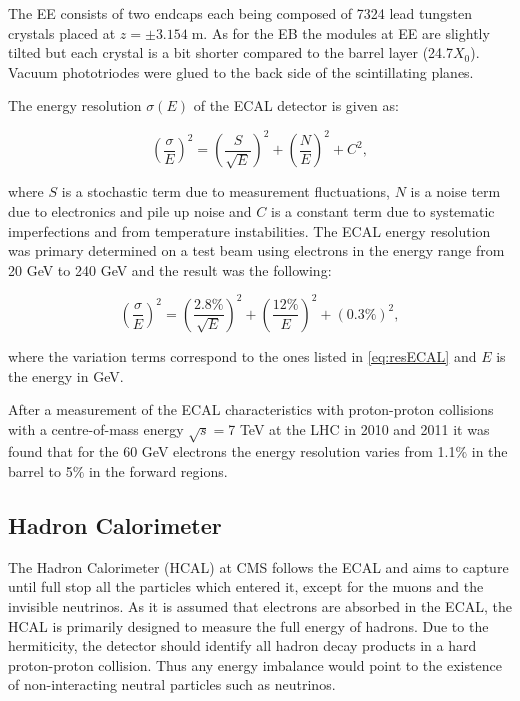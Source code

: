 The EE consists of two endcaps each being composed of 7324 lead tungsten crystals placed at $z = \pm 3.154\;$m. As for the EB the modules
at EE are slightly tilted but each crystal is a bit shorter compared to the barrel layer (24.7$X_{0}$). Vacuum phototriodes\cite{APDVPT} were
glued to the back side of the scintillating planes.

The energy resolution $\sigma(E)$ of the ECAL detector is given as\cite{CMSatLHC}:

\begin{equation}\label{eq:resECAL}
  (\frac{\sigma}{E})^{2} = (\frac{S}{\sqrt{E}})^{2} + (\frac{N}{E})^{2} + C^{2},
\end{equation} 

where $S$ is a stochastic term due to measurement fluctuations, $N$ is a noise term due to electronics and pile up noise
and $C$ is a constant term due to systematic imperfections and from temperature instabilities. 
The ECAL energy resolution was primary determined on a test beam using 
electrons in the energy range from 20 GeV to 240 GeV\cite{ECALres2007} and the result was the following:

\begin{equation}\label{eq:resECAL}
  (\frac{\sigma}{E})^{2} = (\frac{2.8\%}{\sqrt{E}})^{2} + (\frac{12\%}{E})^{2} + (0.3\%)^{2},
\end{equation}

where the variation terms correspond to the ones listed in \ref{eq:resECAL} and $E$ is the energy in GeV.

After a measurement of the ECAL characteristics with proton-proton collisions with a centre-of-mass energy $\sqrt{s} = $7 TeV
at the LHC in 2010 and 2011 it was found that for the 60 GeV electrons the energy resolution varies from 1.1$\%$ in the barrel 
to 5$\%$ in the forward regions\cite{ECALres2013}.

\subsection{Hadron Calorimeter}

The Hadron Calorimeter (HCAL)\cite{CMSatLHC} at CMS follows the ECAL and aims to capture until full stop all the particles which entered it, 
except for the muons and the invisible neutrinos. As it is assumed that electrons are absorbed in the ECAL, the HCAL is primarily designed 
to measure the full energy of hadrons. Due to the hermiticity, the detector should identify all hadron decay products in a hard proton-proton
collision. Thus any energy imbalance would point to the existence of non-interacting neutral particles such as neutrinos.

